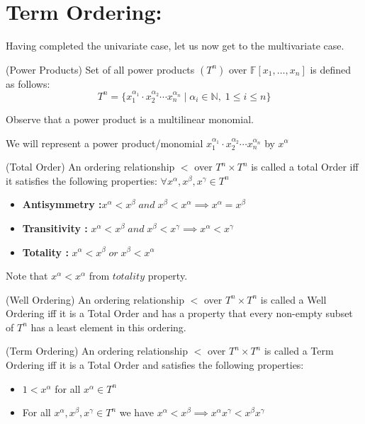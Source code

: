 \section*{Term Ordering:}


Having completed the univariate case, let us now get to the multivariate case.


\begin{definition}(Power Products)
Set of all power products $(T^n)$ over $\mathbb{F}[x_1,\dots,x_n]$ is defined as follows:
$$T^n=\{x_1^{\alpha_{1}}\cdot x_2^{\alpha_{2}}\cdots x_{n}^{\alpha_{n}}\;|\; \alpha_{i}\in \mathbb{N},\;1\leq i\leq n\}$$
\end{definition}
Observe that a power product is a multilinear monomial.

We will represent a power product/monomial $x_1^{\alpha_{1}}\cdot x_2^{\alpha_{2}}\cdots x_{n}^{\alpha_{n}}$ by $x^{\alpha}$ 


\begin{definition}(Total Order)
An ordering relationship $<$ over $T^n \times T^n$ is called a total Order iff it satisfies the following properties:
$ \forall x^{\alpha},x^{\beta},x^{\gamma} \in T^n$
\begin{itemize}
\item \textbf{Antisymmetry :}$ x^{\alpha} < x^{\beta}\; and \;x^{\beta} < x^{\alpha} \implies x^{\alpha} = x^{\beta}$
\item \textbf{Transitivity : }$ x^{\alpha} < x^{\beta} \;and\; x^{\beta} < x^{\gamma} \implies x^{\alpha} < x^{\gamma} $
\item \textbf{ Totality :} $x^{\alpha} < x^{\beta} \;or\; x^{\beta} < x^{\alpha}$
\end{itemize}

Note that $x^{\alpha} < x^{\alpha}$ from $totality$ property.
\end{definition}

\begin{definition}(Well Ordering)
An ordering relationship $<$ over $T^n\times T^n$ is called a Well Ordering iff it is a Total Order and has a property that every non-empty subset of $T^n$ has a least element in this ordering.
\end{definition}

\begin{definition}(Term Ordering) \label{def:term-order}
An ordering relationship $<$ over $T^n\times T^n$ is called a Term Ordering iff it is a Total Order and satisfies the following properties:
\begin{itemize}
\item $1<x^{\alpha}$ for all $x^{\alpha}\in T^n$
\item For all $x^{\alpha},x^{\beta},x^{\gamma}\in T^n$ we have $x^{\alpha}<x^{\beta}\implies x^{\alpha}x^{\gamma}<x^{\beta}x^{\gamma}$
\end{itemize}
\end{definition}

